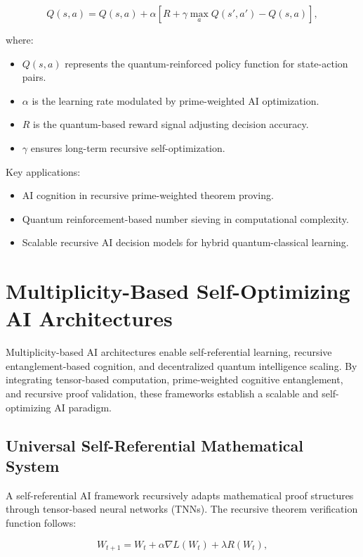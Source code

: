 \documentclass{article}
\theoremstyle{plain}
\begin{document}
\begin{equation}
Q(s, a) = Q(s, a) + \alpha \left[ R + \gamma \max_a Q(s', a') - Q(s, a) \right],
\end{equation}

where:
\begin{itemize}
    \item $Q(s, a)$ represents the quantum-reinforced policy function for state-action pairs.
    \item $\alpha$ is the learning rate modulated by prime-weighted AI optimization.
    \item $R$ is the quantum-based reward signal adjusting decision accuracy.
    \item $\gamma$ ensures long-term recursive self-optimization.
\end{itemize}

Key applications:
\begin{itemize}
    \item AI cognition in recursive prime-weighted theorem proving.
    \item Quantum reinforcement-based number sieving in computational complexity.
    \item Scalable recursive AI decision models for hybrid quantum-classical learning.
\end{itemize}


\section{Multiplicity-Based Self-Optimizing AI Architectures}

Multiplicity-based AI architectures enable self-referential learning, recursive entanglement-based cognition, and decentralized quantum intelligence scaling. By integrating tensor-based computation, prime-weighted cognitive entanglement, and recursive proof validation, these frameworks establish a scalable and self-optimizing AI paradigm.

\subsection{Universal Self-Referential Mathematical System}

A self-referential AI framework recursively adapts mathematical proof structures through tensor-based neural networks (TNNs). The recursive theorem verification function follows:

\begin{equation}
W_{t+1} = W_t + \alpha \nabla L(W_t) + \lambda R(W_t),
\end{equation}
\end{document}
